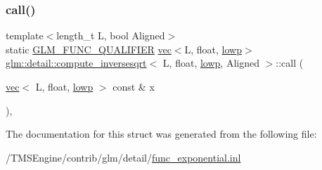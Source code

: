 \subsubsection{\texorpdfstring{call()}{call()}}
{\footnotesize\ttfamily template$<$length\+\_\+t L, bool Aligned$>$ \\
static \hyperlink{setup_8hpp_a33fdea6f91c5f834105f7415e2a64407}{G\+L\+M\+\_\+\+F\+U\+N\+C\+\_\+\+Q\+U\+A\+L\+I\+F\+I\+ER} \hyperlink{structglm_1_1vec}{vec}$<$L, float, \hyperlink{namespaceglm_a36ed105b07c7746804d7fdc7cc90ff25ae161af3fc695e696ce3bf69f7332bc2d}{lowp}$>$ \hyperlink{structglm_1_1detail_1_1compute__inversesqrt}{glm\+::detail\+::compute\+\_\+inversesqrt}$<$ L, float, \hyperlink{namespaceglm_a36ed105b07c7746804d7fdc7cc90ff25ae161af3fc695e696ce3bf69f7332bc2d}{lowp}, Aligned $>$\+::call (\begin{DoxyParamCaption}\item[{\hyperlink{structglm_1_1vec}{vec}$<$ L, float, \hyperlink{namespaceglm_a36ed105b07c7746804d7fdc7cc90ff25ae161af3fc695e696ce3bf69f7332bc2d}{lowp} $>$ const \&}]{x }\end{DoxyParamCaption})\hspace{0.3cm}{\ttfamily [inline]}, {\ttfamily [static]}}



The documentation for this struct was generated from the following file\+:\begin{DoxyCompactItemize}
\item 
/\+T\+M\+S\+Engine/contrib/glm/detail/\hyperlink{func__exponential_8inl}{func\+\_\+exponential.\+inl}\end{DoxyCompactItemize}
